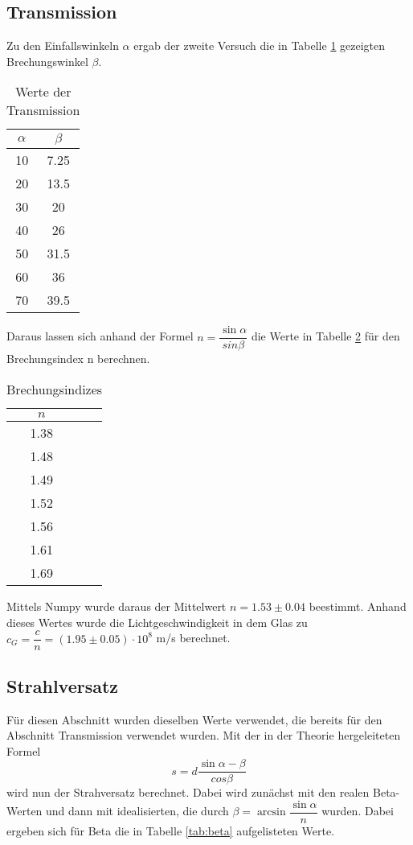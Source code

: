 \subsection{Transmission}
  Zu den Einfallswinkeln $\alpha$ ergab der zweite Versuch die in Tabelle \ref{tab:trans} gezeigten 
  Brechungswinkel $\beta$.
  \begin{table}[H]
    \centering
    \caption{Werte der Transmission}
    \begin{tabular}{c c}
      \toprule
      $\alpha$ & $\beta$\\
      \midrule
        10 & 7.25 \\
        20 & 13.5 \\
        30 & 20   \\
        40 & 26   \\
        50 & 31.5 \\
        60 & 36   \\
        70 & 39.5 \\
      \bottomrule
    \end{tabular}
    \label{tab:trans}
  \end{table}
  \noindent Daraus lassen sich anhand der Formel $n = \dfrac{\sin{\alpha}}{sin{\beta}}$ die
  Werte in Tabelle \ref{tab:brech} für den Brechungsindex n berechnen.
  \begin{table}[H]
    \centering
    \caption{Brechungsindizes}
    \begin{tabular}{c c}
      \toprule
      $n$\\
      \midrule
      1.38 \\
      1.48 \\
      1.49  \\
      1.52   \\
      1.56 \\
      1.61   \\
      1.69 \\
      \bottomrule
    \end{tabular}
    \label{tab:brech}
  \end{table}
  \noindent Mittels Numpy wurde daraus der Mittelwert $n=1.53\pm 0.04$ beestimmt. Anhand 
  dieses Wertes wurde die Lichtgeschwindigkeit in dem Glas zu $c_G=\dfrac{c}{n}= (1.95\pm 0.05)
  \cdot 10^{8}$ m/s berechnet.

\subsection{Strahlversatz}
  Für diesen Abschnitt wurden dieselben Werte verwendet, die bereits für den Abschnitt 
  Transmission verwendet wurden.
  Mit der in der Theorie hergeleiteten Formel 
  \begin{equation*}
    s= d\dfrac{\sin{\alpha - \beta}}{cos{\beta}} 
  \end{equation*}
  wird nun der Strahversatz berechnet. Dabei wird zunächst mit den realen Beta-Werten und dann
  mit idealisierten, die durch $\beta=\arcsin{\dfrac{\sin{\alpha}}{n}}$ wurden. Dabei ergeben 
  sich für Beta die in Tabelle \ref{tab:beta} aufgelisteten Werte.

